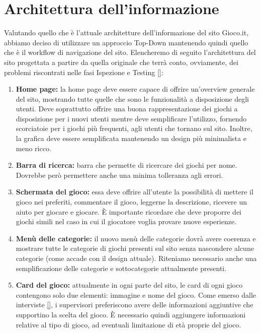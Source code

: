 \documentclass[../Report.tex]{subfiles}
\begin{document}
    \section{Architettura dell'informazione}
    \label{section:architettura dell'informazione}
    Valutando quello che è l'attuale architetture dell'informazione del sito Gioco.it, abbiamo deciso di utilizzare un approccio Top-Down mantenendo quindi quello che è il workflow di navigazione del sito. Elencheremo di seguito l'architettura del sito progettata a partire da quella originale che terrà conto, ovviamente, dei problemi riscontrati nelle fasi Ispezione e Testing \ref{}:
    \begin{enumerate}
        \item \textbf{Home page:} la home page deve essere capace di offrire un'overview generale del sito, mostrando tutte quelle che sono le funzionalità a disposizione degli utenti. Deve soprattutto offrire una buona rappresentazione dei giochi a disposizione per i nuovi utenti mentre deve semplificare l'utilizzo, fornendo scorciatoie per i giochi più frequenti, agli utenti che tornano sul sito. Inoltre, la grafica deve essere semplificata mantenendo un design più minimalista e meno ricco.
        \item \textbf{Barra di ricerca:} barra che permette di ricercare dei giochi per nome. Dovrebbe però permettere anche una minima tolleranza agli errori.
        \item \textbf{Schermata del gioco:} essa deve offrire all'utente la possibilità di mettere il gioco nei preferiti, commentare il gioco, leggerne la descrizione, ricevere un aiuto per giocare e giocare. È importante ricordare che deve proporre dei giochi simili nel caso in cui il giocatore voglia provare nuove esperienze.
        \item \textbf{Menù delle categorie:} il nuovo menù delle categorie dovrà avere coerenza e mostrare tutte le categorie di giochi presenti sul sito senza nascondere alcune categorie (come accade con il design attuale). Riteniamo necessario anche una semplificazione delle categorie e sottocategorie attualmente presenti.
        \item \textbf{Card del gioco:} attualmente in ogni parte del sito, le card di ogni gioco contengono solo due elementi: immagine e nome del gioco. Come emerso dalle interviste \ref{}, i supervisori preferiscono avere delle informazioni aggiuntive che supportino la scelta del gioco. È necessario quindi aggiungere informazioni relative al tipo di gioco, ad eventuali limitazione di età proprie del gioco.

\end{enumerate}
\end{document}
